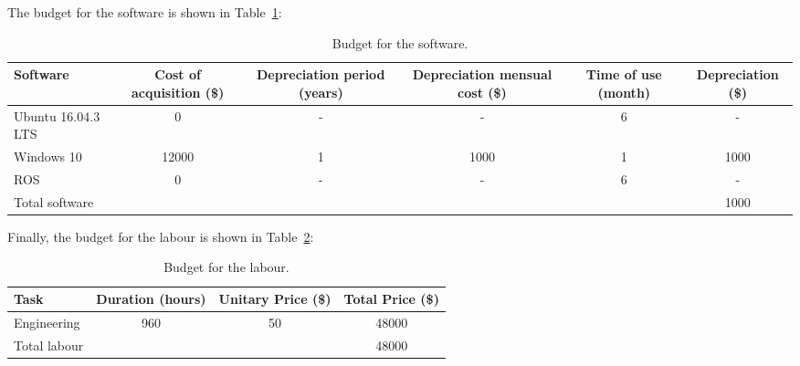 The budget for the software is shown in Table~\ref{tab:software}:
\begin{table}[h!]
	\centering
	\begin{tabular}{p{6em}ccccc}
		\toprule
		Software & \multicolumn{1}{p{6.5em}}{Cost of acquisition (\$)} & \multicolumn{1}{p{7em}}{Depreciation period (years)} & \multicolumn{1}{p{9em}}{Depreciation mensual cost (\$)} & \multicolumn{1}{p{6em}}{Time of use (month)} & \multicolumn{1}{p{3em}}{Depreciation (\$)} \\
		\midrule
		Ubuntu 16.04.3 LTS & 0     & \multicolumn{1}{p{7em}}{-} & \multicolumn{1}{p{9em}}{-} & 6     & \multicolumn{1}{p{3em}}{-} \\
		\midrule
		Windows 10 & 12000 & 1     & 1000  & 1     & 1000 \\
		\midrule
		ROS   & 0     & \multicolumn{1}{p{7em}}{-} & \multicolumn{1}{p{9em}}{-} & 6     & \multicolumn{1}{p{3em}}{-} \\
		\midrule
		Total software &       &       &       &       & 1000 \\
		\bottomrule
	\end{tabular}%
	\caption{Budget for the software.}
	\label{tab:software}%
\end{table}%

Finally, the budget for the labour is shown in Table~\ref{tab:labour}:
\begin{table}[h!]
	\centering
	\begin{tabular}{p{6.18em}ccc}
		\toprule
		{Task} & \multicolumn{1}{c}{{Duration (hours)}} &  \multicolumn{1}{p{8em}}{Unitary Price (\$)} & \multicolumn{1}{p{8em}}{Total Price (\$)} \\
		\midrule
		Engineering & 960   & 50    & 48000 \\
		\midrule
		Total labour &       &       & 48000 \\
		\bottomrule
	\end{tabular}%
	\caption{Budget for the labour.}
	\label{tab:labour}%
\end{table}%

